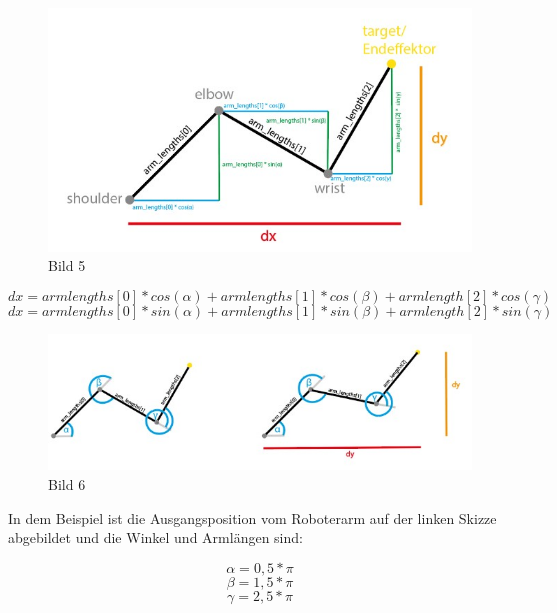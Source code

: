 \documentclass[12pt]{article}
\begin{document}
                    \begin{figure}[h]
                        \centering
                        \includegraphics[width = \linewidth]{Bild 5}
                        \caption{Bild 5}
                    \end{figure}

                    \[
                        dx = armlengths[0] * cos(\alpha) + armlengths[1] * cos(\beta) + armlength[2] * cos(\gamma)
                    \]
                    \[
                        dx = armlengths[0] * sin(\alpha) + armlengths[1] * sin(\beta) + armlength[2] * sin(\gamma)
                    \]

                    \begin{figure}[h]
                        \centering
                        \includegraphics[width = \linewidth]{Bild 6}
                        \caption{Bild 6}
                    \end{figure}

                    In dem Beispiel ist die Ausgangsposition vom Roboterarm auf der linken Skizze abgebildet und die
                    Winkel und Armlängen sind:

                    \[
                        \alpha = 0,5*\pi
                    \]
                    \[
                        \beta = 1,5 * \pi
                    \]
                    \[
                        \gamma = 2,5 * \pi
                    \]
\end{document}
